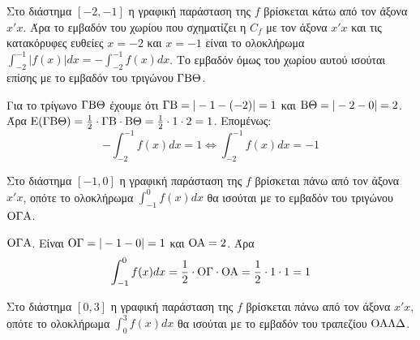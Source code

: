 \begin{figure}
\end{figure}

\begin{alist}
    \item[α)]
    \begin{rlist}
        \item Στο διάστημα $[-2,-1]$ η γραφική παράσταση της $f$ βρίσκεται κάτω από τον άξονα $x'x$. Άρα το εμβαδόν του χωρίου που σχηματίζει η $C_f$ με τον άξονα $x'x$ και τις κατακόρυφες ευθείες $x=-2$ και $x=-1$ είναι το ολοκλήρωμα $\int_{-2}^{-1} |f(x)|dx = -\int_{-2}^{-1} f(x)dx$. Το εμβαδόν όμως του χωρίου αυτού ισούται επίσης με το εμβαδόν του τριγώνου $\Gamma{\rm B}\Theta$.

        Για το τρίγωνο $\Gamma{\rm B}\Theta$ έχουμε ότι $\Gamma{\rm B} = |-1 - (-2)| = 1$ και ${\rm B}\Theta = |-2 - 0| = 2$.
        Άρα ${\rm E}(\Gamma{\rm B}\Theta) = \frac{1}{2} \cdot \Gamma{\rm B} \cdot {\rm B}\Theta = \frac{1}{2} \cdot 1 \cdot 2 = 1$. Επομένως:
        \[
            -\int_{-2}^{-1} f(x)dx = 1 \iff \int_{-2}^{-1} f(x)dx = -1
        \]

        \item Στο διάστημα $[-1,0]$ η γραφική παράσταση της $f$ βρίσκεται πάνω από τον άξονα $x'x$, οπότε το ολοκλήρωμα $\int_{-1}^{0} f(x)dx$ θα ισούται με το εμβαδόν του τριγώνου ${\rm O}\Gamma{\rm A}$.

        ${\rm O}\Gamma{\rm A}$. Είναι ${\rm O}\Gamma = |-1 - 0| = 1$ και ${\rm O}{\rm A} = 2$. Άρα
        \[
            \int_{-1}^{0} f(x)dx = \frac{1}{2} \cdot {\rm O}\Gamma \cdot {\rm O}{\rm A} = \frac{1}{2} \cdot 1 \cdot 1 = 1
        \]

        \item Στο διάστημα $[0,3]$ η γραφική παράσταση της $f$ βρίσκεται πάνω από τον άξονα $x'x$, οπότε το ολοκλήρωμα $\int_{0}^{3} f(x)dx$ θα ισούται με το εμβαδόν του τραπεζίου ${\rm O}{\rm A}\Lambda\Delta$.


\end{rlist}
\end{alist}
